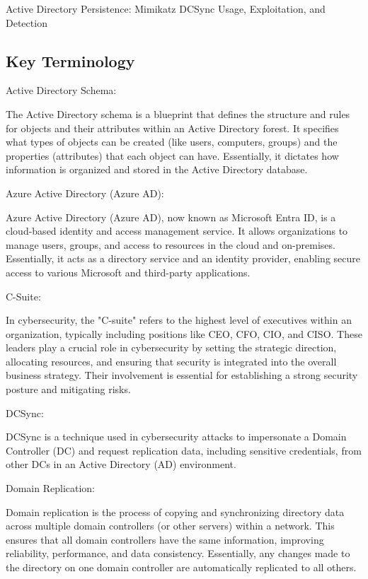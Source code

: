 
Active Directory Persistence: Mimikatz DCSync Usage, Exploitation, and Detection

\subsection{Key Terminology}

Active Directory Schema:

The Active Directory schema is a blueprint that defines the structure and rules for objects and their attributes within an Active Directory forest. It specifies what types of objects can be created (like users, computers, groups) and the properties (attributes) that each object can have. Essentially, it dictates how information is organized and stored in the Active Directory database.

Azure Active Directory (Azure AD):

Azure Active Directory (Azure AD), now known as Microsoft Entra ID, is a cloud-based identity and access management service. It allows organizations to manage users, groups, and access to resources in the cloud and on-premises. Essentially, it acts as a directory service and an identity provider, enabling secure access to various Microsoft and third-party applications.

C-Suite:

In cybersecurity, the "C-suite" refers to the highest level of executives within an organization, typically including positions like CEO, CFO, CIO, and CISO. These leaders play a crucial role in cybersecurity by setting the strategic direction, allocating resources, and ensuring that security is integrated into the overall business strategy. Their involvement is essential for establishing a strong security posture and mitigating risks.

DCSync:

DCSync is a technique used in cybersecurity attacks to impersonate a Domain Controller (DC) and request replication data, including sensitive credentials, from other DCs in an Active Directory (AD) environment.

Domain Replication:

Domain replication is the process of copying and synchronizing directory data across multiple domain controllers (or other servers) within a network. This ensures that all domain controllers have the same information, improving reliability, performance, and data consistency. Essentially, any changes made to the directory on one domain controller are automatically replicated to all others.

